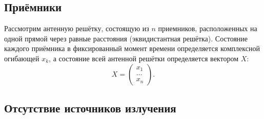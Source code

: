 \subsection{Приёмники}

Рассмотрим антенную решётку, состоящую из $n$ приемников, расположенных на одной прямой через равные расстояния (эквидистантная решётка). Состояние каждого
приёмника в фиксированный момент времени определяется комплексной огибающей $x_k$, а состояние всей антенной решётки определяется вектором $X$:
\[
    X =
    \begin{pmatrix}
        x_1   \\
        \dots \\
        x_n
    \end{pmatrix}
    .
\]

\subsection{Отсутствие источников излучения}

